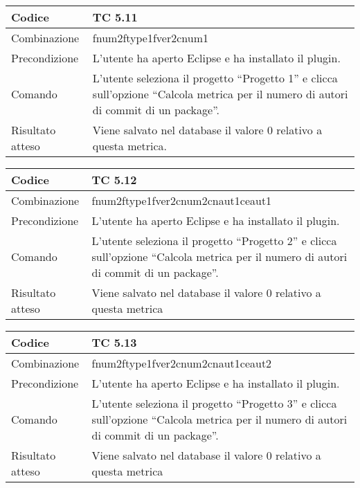 \begin{table}[ht]
\begin{tabular}{|p{3cm}|p{9cm}|}
\hline
\cellcolor{lightgray}Codice				& TC 5.11								\\
\hline
\cellcolor{lightgray}Combinazione		& fnum2ftype1fver2cnum1									\\
\hline
\cellcolor{lightgray}Precondizione		& L'utente ha aperto Eclipse e ha installato il plugin.		\\
\hline
\cellcolor{lightgray}Comando			& L'utente seleziona il progetto ``Progetto 1''  e clicca sull'opzione ``Calcola metrica per il numero di autori di commit di un package''.	\\
\hline
\cellcolor{lightgray}Risultato atteso	& Viene salvato nel database il valore 0 relativo a questa metrica.\\
\hline
\end{tabular}
\end{table}

\begin{table}[ht]
\begin{tabular}{|p{3cm}|p{9cm}|}
\hline
\cellcolor{lightgray}Codice				& TC 5.12								\\
\hline
\cellcolor{lightgray}Combinazione		& fnum2ftype1fver2cnum2cnaut1ceaut1 									\\
\hline
\cellcolor{lightgray}Precondizione		& L'utente ha aperto Eclipse e ha installato il plugin.				\\
\hline
\cellcolor{lightgray}Comando			& L'utente seleziona il progetto ``Progetto 2''  e clicca sull'opzione ``Calcola metrica per il numero di autori di commit di un package''.	\\
\hline
\cellcolor{lightgray}Risultato atteso	& Viene salvato nel database il valore 0 relativo a questa metrica	\\
\hline
\end{tabular}
\end{table}

\begin{table}[ht]
\begin{tabular}{|p{3cm}|p{9cm}|}
\hline
\cellcolor{lightgray}Codice				& TC 5.13								\\
\hline
\cellcolor{lightgray}Combinazione		& fnum2ftype1fver2cnum2cnaut1ceaut2									\\
\hline
\cellcolor{lightgray}Precondizione		& L'utente ha aperto Eclipse e ha installato il plugin.					\\
\hline
\cellcolor{lightgray}Comando			& L'utente seleziona il progetto ``Progetto 3''  e clicca sull'opzione ``Calcola metrica per il numero di autori di commit di un package''.	\\
\hline
\cellcolor{lightgray}Risultato atteso	& Viene salvato nel database il valore 0 relativo a questa metrica	\\
\hline
\end{tabular}
\end{table}

